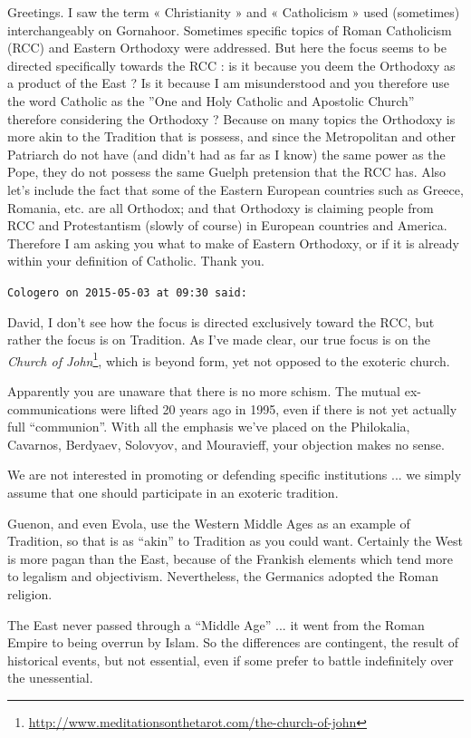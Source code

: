 \begin{footnotesize}
\begin{sffamily}
Greetings. I saw the term « Christianity » and « Catholicism » used (sometimes) interchangeably on Gornahoor. Sometimes specific topics of Roman Catholicism (RCC) and Eastern Orthodoxy were addressed. But here the focus seems to be directed specifically towards the RCC : is it because you deem the Orthodoxy as a product of the East ? Is it because I am misunderstood and you therefore use the word Catholic as the ''One and Holy Catholic and Apostolic Church'' therefore considering the Orthodoxy ? Because on many topics the Orthodoxy is more akin to the Tradition that is possess, and since the Metropolitan and other Patriarch do not have (and didn't had as far as I know) the same power as the Pope, they do not possess the same Guelph pretension that the RCC has. Also let's include the fact that some of the Eastern European countries such as Greece, Romania, etc. are all Orthodox; and that Orthodoxy is claiming people from RCC and Protestantism (slowly of course) in European countries and America. Therefore I am asking you what to make of Eastern Orthodoxy, or if it is already within your definition of Catholic. Thank you.

\hfill

\texttt{Cologero on 2015-05-03 at 09:30 said:}

David, I don't see how the focus is directed exclusively toward the RCC, but rather the focus is on Tradition. As I've made clear, our true focus is on the \textit{Church of John}\footnote{\url{http://www.meditationsonthetarot.com/the-church-of-john}}, which is beyond form, yet not opposed to the exoteric church.

Apparently you are unaware that there is no more schism. The mutual ex-communications were lifted 20 years ago in 1995, even if there is not yet actually full ``communion''. With all the emphasis we've placed on the Philokalia, Cavarnos, Berdyaev, Solovyov, and Mouravieff, your objection makes no sense.

We are not interested in promoting or defending specific institutions ... we simply assume that one should participate in an exoteric tradition.

Guenon, and even Evola, use the Western Middle Ages as an example of Tradition, so that is as ``akin'' to Tradition as you could want. Certainly the West is more pagan than the East, because of the Frankish elements which tend more to legalism and objectivism. Nevertheless, the Germanics adopted the Roman religion.

The East never passed through a ``Middle Age'' ... it went from the Roman Empire to being overrun by Islam. So the differences are contingent, the result of historical events, but not essential, even if some prefer to battle indefinitely over the unessential.


\end{sffamily}
\end{footnotesize}
